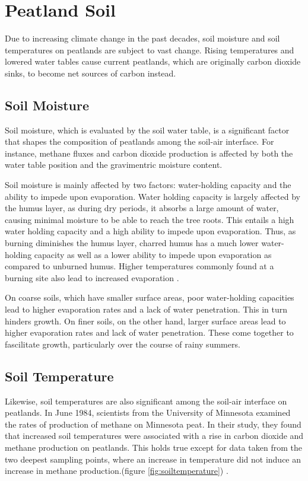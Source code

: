 \section{Peatland Soil}

Due to increasing climate change in the past decades, soil moisture and soil temperatures on peatlands are subject to vast change. Rising temperatures and lowered water tables cause current peatlands, which are originally carbon dioxide sinks, to become net sources of carbon instead.

\subsection{Soil Moisture}

Soil moisture, which is evaluated by the soil water table, is a significant factor that shapes the composition of peatlands among the soil-air interface. For instance, methane fluxes and carbon dioxide production is affected by both the water table position and the gravimentric moisture content.

Soil moisture is mainly affected by two factors: water-holding capacity and the ability to impede upon evaporation. Water holding capacity is largely affected by the humus layer, as during dry periods, it absorbs a large amount of water, causing minimal moisture to be able to reach the tree roots. This entails a high water holding capacity and a high ability to impede upon evaporation. Thus, as burning diminishes the humus layer, charred humus has a much lower water-holding capacity as well as a lower ability to impede upon evaporation as compared to unburned humus. Higher temperatures commonly found at a burning site also lead to increased evaporation \citep{kozlowski2012fire}.

On coarse soils, which have smaller surface areas, poor water-holding capacities lead to higher evaporation rates and a lack of water penetration. This in turn hinders growth. On finer soils, on the other hand, larger surface areas lead to higher evaporation rates and lack of water penetration. These come together to fascilitate growth, particularly over the course of rainy summers.

\subsection{Soil Temperature}

Likewise, soil temperatures are also significant among the soil-air interface on peatlands. In June 1984, scientists from the University of Minnesota examined the rates of production of methane on Minnesota peat. In their study, they found that increased soil temperatures were associated with a rise in carbon dioxide and methane production on peatlands. This holds true except for data taken from the two deepest sampling points, where an increase in temperature did not induce an increase in methane production.(figure \ref{fig:soiltemperature}) \citep{williams1984methane}.

